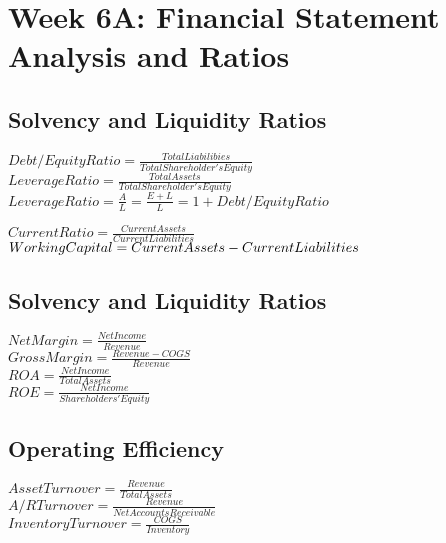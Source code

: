\section*{Week 6A: Financial Statement Analysis and Ratios}

\subsection*{Solvency and Liquidity Ratios}

$Debt/EquityRatio = \frac{Total Liabilibies}{Total Shareholder's Equity}$ \\

$Leverage Ratio = \frac{TotalAssets}{Total Shareholder's Equity}$ \\

$Leverage Ratio = \frac{A}{L}=\frac{E+L}{L} = 1+ Debt/EquityRatio$ 


$Current Ratio = \frac{Current Assets}{Current Liabilities}$ \\


$Working Capital = \\ Current Assets - Current Liabilities $ 



\subsection*{Solvency and Liquidity Ratios}

$Net Margin = \frac{Net Income}{Revenue}$ \\

$Gross Margin = \frac{Revenue - COGS}{Revenue}$ \\

$ROA = \frac{Net Income}{Total Assets}$ \\

$ROE = \frac{Net Income}{Shareholders' Equity}$ 

\subsection*{Operating Efficiency}

$Asset Turnover = \frac{Revenue}{Total Assets}$  \\

$A/R Turnover = \frac{Revenue}{Net Accounts Receivable}$  \\

$Inventory Turnover = \frac{COGS}{Inventory}$  \\

